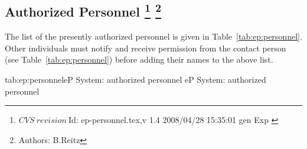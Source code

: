 \begin{safetyen}{0}{0}
\section[Authorized  Personnel]{Authorized  Personnel
\footnote{
   $CVS~revision~ $Id: ep-personnel.tex,v 1.4 2008/04/28 15:35:01 gen Exp $ $
 }
\footnote{Authors: B.Reitz }
}
\end{safetyen}
The list
of the presently authorized personnel is given in Table~\ref{tab:ep:personnel}.
Other individuals must notify and receive permission from
the contact person (see Table~\ref{tab:ep:personnel}) before adding their names 
to the above list.
\begin{namestab}{tab:ep:personnel}{eP System: authorized personnel}{%
   eP System: authorized personnel}
 \PierreBertin{}
\end{namestab}

%
%
%
%
%
